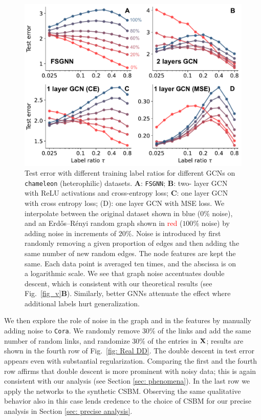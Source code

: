\documentclass[9pt,twocolumn]{pnas-new}
\begin{document}
\begin{figure}[t]
    \centering
    \includegraphics[width=\linewidth]{figs_chameleon4_loss.pdf}
    \caption{Test error with different training label ratios for different GCNs on \texttt{chameleon} (heterophilic) datasets. \textbf{\textsf{A}}: \texttt{FSGNN}\cite{maurya2021improving}; \textbf{\textsf{B}}: two- layer GCN with ReLU activations and cross-entropy loss; \textbf{\textsf{C}}: one layer GCN with cross entropy loss; (D): one layer GCN with MSE loss.   
    We interpolate between the original dataset shown in {\textcolor{myblue}{blue}}  ($0\%$ noise), and an Erdős–Rényi random graph shown in {\textcolor{red}{red}} ($100\%$ noise) by adding noise in increments of $20\%$. Noise is introduced by first randomly removing a given proportion of edges and then adding the same number of new random edges. The node features are kept the same. Each data point is averaged ten times, and the abscissa is on a logarithmic scale. We see that graph noise accentuates double descent, which is consistent with our theoretical results (see Fig.~\ref{fig_v}\textbf{\textsf{B}}). Similarly, better GNNs attenuate the effect where additional labels hurt generalization.}
    \label{fig:chameleon4_loss}
\end{figure}



We then explore the role of noise in the graph and in the features by manually adding noise to \texttt{Cora}. We randomly remove $30\%$ of the links and add the same number of random links, and randomize $30\%$ of the entries in $\mathbf{X}$; results are shown in the fourth row of Fig.~\ref{fig: Real DD}. The double descent in test error appears even with substantial regularization. Comparing the first and the fourth row affirms that double descent is more prominent with noisy data; this is again consistent with our analysis (see Section \ref{sec: phenomena}).
In the last row we apply the networks to the synthetic CSBM. Observing the same qualitative behavior also in this case lends credence to the choice of CSBM for our precise analysis in Section \ref{sec: precise analysis}.
\end{document}
